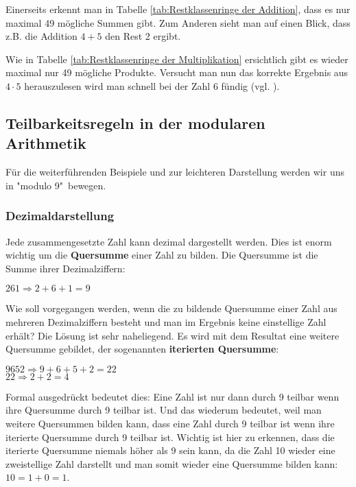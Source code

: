\documentclass[12pt,a4paper]{article}
\theoremstyle{definition}
\begin{document}
Einerseits erkennt man in Tabelle \ref{tab:Restklassenringe der Addition}, dass es nur maximal 49 mögliche Summen gibt.
Zum Anderen sieht man auf einen Blick, dass z.B. die Addition $4 + 5$ den Rest 2 ergibt.

Wie in Tabelle \ref{tab:Restklassenringe der Multiplikation} ersichtlich gibt es wieder maximal nur 49 mögliche Produkte.
Versucht man nun das korrekte Ergebnis aus $4 \cdot 5$ herauszulesen wird man schnell bei der Zahl 6 fündig (vgl. \cite[68]{RempeGillen2009}).

\newpage
\subsection{Teilbarkeitsregeln in der modularen Arithmetik}
Für die weiterführenden Beispiele und zur leichteren Darstellung werden wir uns in "modulo 9"\ bewegen.

\subsubsection{Dezimaldarstellung}
Jede zusammengesetzte Zahl kann dezimal dargestellt werden.
Dies ist enorm wichtig um die \textbf{Quersumme} einer Zahl zu bilden.
Die Quersumme ist die Summe ihrer Dezimalziffern:
\begin{center}
$261 \Rightarrow 2 + 6 +1 = 9$
\end{center}
Wie soll vorgegangen werden, wenn die zu bildende Quersumme einer Zahl aus mehreren Dezimalziffern besteht und man im Ergebnis keine einstellige Zahl erhält?
Die Lösung ist sehr naheliegend.
Es wird mit dem Resultat eine weitere Quersumme gebildet, der sogenannten \textbf{iterierten Quersumme}:
\begin{center}
$9652 \Rightarrow 9 + 6 + 5 + 2 = 22$\\
$ 22 \Rightarrow 2 + 2 = 4$
\end{center}
Formal ausgedrückt bedeutet dies:\newline
Eine Zahl ist nur dann durch 9 teilbar wenn ihre Quersumme durch 9 teilbar ist.
Und das wiederum bedeutet, weil man weitere Quersummen bilden kann, dass eine Zahl durch 9 teilbar ist wenn ihre iterierte Quersumme durch 9 teilbar ist.
Wichtig ist hier zu erkennen, dass die iterierte Quersumme niemals höher als 9 sein kann, da die Zahl 10 wieder eine zweistellige Zahl darstellt und man somit wieder eine Quersumme bilden kann: $10 = 1 + 0 = 1$.
\end{document}
